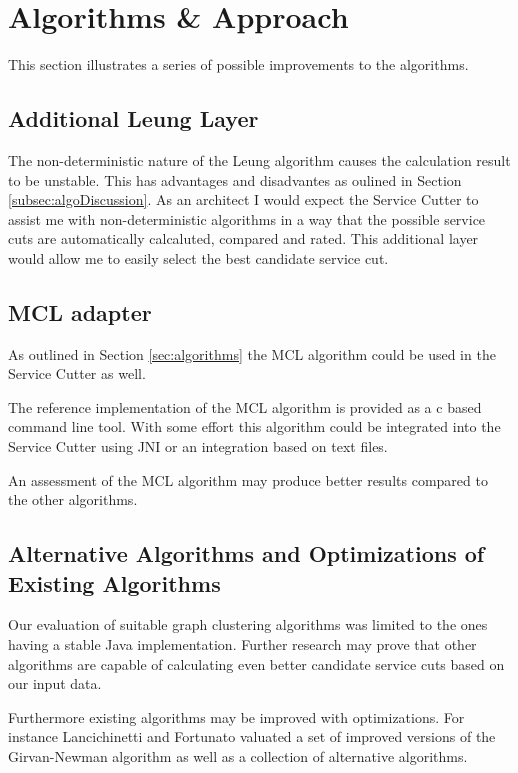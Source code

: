 \section{Algorithms \& Approach}

This section illustrates a series of possible improvements to the algorithms.

\subsection{Additional Leung Layer}

The non-deterministic nature of the Leung algorithm causes the calculation result to be unstable. This has advantages and disadvantes as oulined in Section \ref{subsec:algoDiscussion}. As an architect I would expect the Service Cutter to assist me with non-deterministic algorithms in a way that the possible service cuts are automatically calcaluted, compared and rated. This additional layer would allow me to easily select the best candidate service cut.

\subsection{MCL adapter}
\label{subsec:mclAdapter}

As outlined in Section \ref{sec:algorithms} the MCL algorithm could be used in the Service Cutter as well.

The reference implementation of the MCL algorithm is provided as a \gls{c} based command line tool. With some effort this algorithm could be integrated into the Service Cutter using \gls{JNI} or an integration based on text files.

An assessment of the MCL algorithm may produce better results compared to the other algorithms.

\subsection{Alternative Algorithms and Optimizations of Existing Algorithms}

Our evaluation of suitable graph clustering algorithms was limited to the ones having a stable Java implementation. Further research may prove that other algorithms are capable of calculating even better candidate service cuts based on our input data.

Furthermore existing algorithms may be improved with optimizations. For instance Lancichinetti and Fortunato\cite{lancichinetti2009community} valuated a set of improved versions of the Girvan-Newman algorithm as well as a collection of alternative algorithms.

